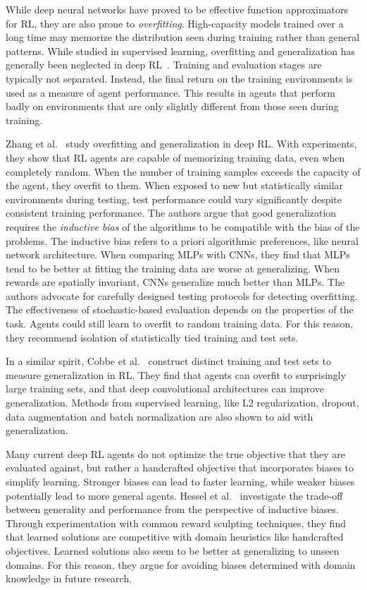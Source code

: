 While deep neural networks have proved to be effective function approximators for RL, they are also prone to \textit{overfitting}.
High-capacity models trained over a long time may memorize the distribution seen during training rather than general patterns.
While studied in supervised learning, overfitting and generalization has generally been neglected in deep RL~\cite{kirk_survey_2022}.
Training and evaluation stages are typically not separated.
Instead, the final return on the training environments is used as a measure of agent performance.
This results in agents that perform badly on environments that are only slightly different from those seen during training.

Zhang et al.~\cite{zhang_overfitting_2018} study overfitting and generalization in deep RL.
With experiments, they show that RL agents are capable of memorizing training data, even when completely random.
When the number of training samples exceeds the capacity of the agent, they overfit to them.
When exposed to new but statistically similar environments during testing, test performance could vary significantly despite consistent training performance.
The authors argue that good generalization requires the \textit{inductive bias} of the algorithms to be compatible with the bias of the problems.
The inductive bias refers to a priori algorithmic preferences, like neural network architecture.
When comparing MLPs with CNNs, they find that MLPs tend to be better at fitting the training data are worse at generalizing.
When rewards are spatially invariant, CNNs generalize much better than MLPs.
The authors advocate for carefully designed testing protocols for detecting overfitting.
The effectiveness of stochastic-based evaluation depends on the properties of the task.
Agents could still learn to overfit to random training data. 
For this reason, they recommend isolation of statistically tied training and test sets.

In a similar spirit, Cobbe et al.~\cite{cobbe_generalization_2019} construct distinct training and test sets to measure generalization in RL.
They find that agents can overfit to surprisingly large training sets, and that deep convolutional architectures can improve generalization.
Methods from supervised learning, like L2 regularization, dropout, data augmentation and batch normalization are also shown to aid with generalization.

Many current deep RL agents do not optimize the true objective that they are evaluated against,
but rather a handcrafted objective that incorporates biases to simplify learning.
Stronger biases can lead to faster learning, while weaker biases potentially lead to more general agents.
Hessel et al.~\cite{hessel_inductive_2019} investigate the trade-off between generality and performance from the perspective of inductive biases.
Through experimentation with common reward sculpting techniques, they find that learned solutions are competitive with domain heuristics like handcrafted objectives.
Learned solutions also seem to be better at generalizing to unseen domains.
For this reason, they argue for avoiding biases determined with domain knowledge in future research.

